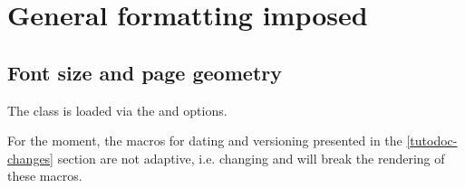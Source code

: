 \documentclass{tutodoc}
\begin{document}
\section{General formatting imposed}

\subsection{Font size and page geometry}

The  class is loaded via the  and  options.


\begin{tdocwarn}
	For the moment, the macros for dating and versioning presented in the \ref{tutodoc-changes} section are not adaptive, i.e. changing  and  will break the rendering of these macros.
\end{tdocwarn}
\end{document}

